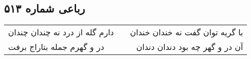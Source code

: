 \begin{center}
\section*{رباعی شماره ۵۱۳}
\label{sec:sh513}
\begin{longtable}{l p{0.5cm} r}
دارم گله از درد نه چندان چندان
&&
با گریه توان گفت نه خندان خندان
\\
در و گهرم جمله بتاراج برفت
&&
آن در و گهر چه بود دندان دندان
\\
\end{longtable}
\end{center}
